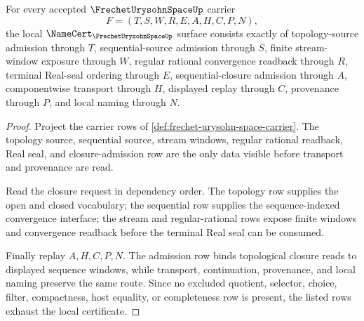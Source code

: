 \begin{theorem}\label{thm:frechet-urysohn-space-namecert-obligations}
For every accepted $\FrechetUrysohnSpaceUp$ carrier
$$
F=(T,S,W,R,E,A,H,C,P,N),
$$
the local $\NameCert_{\FrechetUrysohnSpaceUp}$ surface consists exactly of topology-source admission through $T$, sequential-source admission through $S$, finite stream-window exposure through $W$, regular rational convergence readback through $R$, terminal Real-seal ordering through $E$, sequential-closure admission through $A$, componentwise transport through $H$, displayed replay through $C$, provenance through $P$, and local naming through $N$.
\end{theorem}
\begin{proof}
Project the carrier rows of \autoref{def:frechet-urysohn-space-carrier}. The topology source, sequential source, stream windows, regular rational readback, Real seal, and closure-admission row are the only data visible before transport and provenance are read.

Read the closure request in dependency order. The topology row supplies the open and closed vocabulary; the sequential row supplies the sequence-indexed convergence interface; the stream and regular-rational rows expose finite windows and convergence readback before the terminal Real seal can be consumed.

Finally replay $A,H,C,P,N$. The admission row binds topological closure reads to displayed sequence windows, while transport, continuation, provenance, and local naming preserve the same route. Since no excluded quotient, selector, choice, filter, compactness, host equality, or completeness row is present, the listed rows exhaust the local certificate.
\end{proof}

